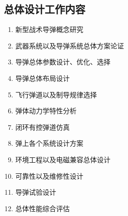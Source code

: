 \subsection{总体设计工作内容}
\begin{enumerate}[1)]
    \item 新型战术导弹概念研究
    \item 武器系统以及导弹系统总体方案论证
    \item 导弹总体参数设计、优化、选择
    \item 导弹总体布局设计
    \item 飞行弹道以及制导规律选择
    \item 弹体动力学特性分析
    \item 闭环有控弹道仿真
    \item 弹上各个系统设计方案
    \item 环境工程以及电磁兼容总体设计
    \item 可靠性以及维修性设计
    \item 导弹试验设计
    \item 总体性能综合评估
\end{enumerate}
